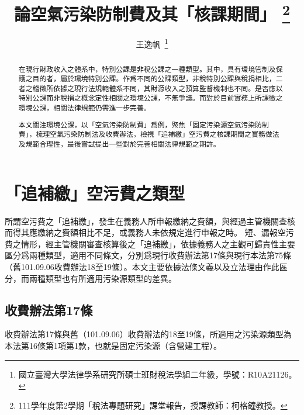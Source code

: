 \documentclass[11pt,a4paper]{article}
\author{王逸帆\,
\thanks{國立臺灣大學法律學系研究所碩士班財稅法學組二年級，學號：R10A21126。}
\vspace{-60em}
}
\date{}
\title{論空氣污染防制費及其「核課期間」
\thanks{
  111學年度第2學期「稅法專題研究」課堂報告，授課教師：柯格鐘教授。}}
\begin{document}
\maketitle
\makeatother

\vspace{1pt}

\begin{abstract}
\setlength{\parindent}{2em}
\noindent
\hspace*{0.9\parindent}
在現行財政收入之體系中，特別公課是非稅公課之一種類型。其中，具有環境管制及保護之目的者，屬於環境特別公課。作爲不同的公課類型，非稅特別公課與稅捐相比，二者之稽徵所依據之現行法規範體系不同，其財源收入之預算監督機制也不同。是否應以特別公課而非稅捐之概念定性相關之環境公課，不無爭議。而對於目前實務上所課徵之環境公課，相關法律規範仍需進一步完善。

本文關注環境公課，以「空氣污染防制費」爲例，聚焦「固定污染源空氣污染防制費」，梳理空氣污染防制法及收費辦法，檢視「追補繳」空污費之核課期間之實務做法及規範合理性，最後嘗試提出一些對於完善相關法律規範之期許。

   \end{abstract}



\thispagestyle{empty} %
\clearpage
    

\tableofcontents 


\thispagestyle{empty} %
\clearpage
\setcounter{page}{1} %



\section{「追補繳」空污費之類型}


所謂空污費之「追補繳」，發生在義務人所申報繳納之費額，與經過主管機關查核而得其應繳納之費額相比不足，或義務人未依規定進行申報之時。
短、漏報空污費之情形，經主管機關審查核算後之「追補繳」，依據義務人之主觀可歸責性主要區分爲兩種類型，適用不同條文，分別爲現行收費辦法第17條與現行本法第75條（舊101.09.06收費辦法18至19條）。本文主要依據法條文義以及立法理由作此區分，而兩種類型也有所適用污染源類型的差異。

\subsection{收費辦法第17條}

收費辦法第17條與舊（101.09.06）收費辦法的18至19條，所適用之污染源類型為本法第16條第1項第1款，也就是固定污染源（含營建工程）。
\end{document}
